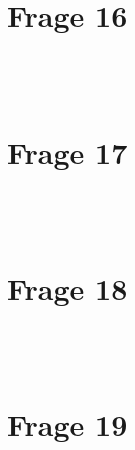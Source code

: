 \documentclass[a4paper]{scrartcl}
\begin{document}
~\\
~\\
\section*{Frage 16}

~\\
~\\
\section*{Frage 17}

~\\
~\\
\section*{Frage 18}

~\\
~\\
\section*{Frage 19}

~\\
~\\
\end{document}
